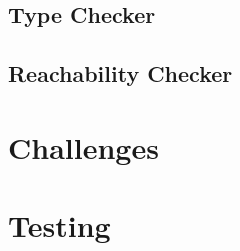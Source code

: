 \documentclass[letterpaper]{article}
\begin{document}
  \subsection{Type Checker}
  \subsection{Reachability Checker}

  \section{Challenges}

  \section{Testing}
\end{document}
